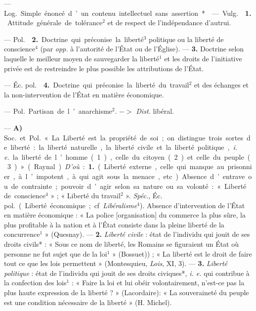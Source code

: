 \begin{itemize}[leftmargin=1cm, label=, itemsep=1pt]
 — \si{Log.} Simple énoncé d’un contenu intellectuel sans
assertion*.

 — \si{Vulg.}  {\bf 1.} Attitude générale de
tolérance$^2$ et de respect de l'indépendance d’autrui.

— \si{Pol.}  {\bf 2.} Doctrine qui préconise la liberté$^3$
politique ou la liberté de conscience$^4$ (par {\it opp.} à l'autorité de
l'État ou de l'Église). — {\bf 3.} Doctrine selon laquelle le meilleur moyen
de sauvegarder la liberté$^1$ et les droits de l'initiative privée est de
restreindre le plus possible les attributions de l’État.

— \si{Éc. pol.}  {\bf 4.} Doctrine qui préconise la liberté du
travail$^2$ et des échanges et la non-intervention de l'État en matière
économique.

 — \si{Pol.} Partisan de l’anarchisme$^2$. $->$ {\it  Dist.}
libéral.

 — {\bf A)} \si{Soc.} et \si{Pol.} « La Liberté
est la propriété de soi ; on distingue
trois sortes de liberté : la liberté naturelle, la liberté civile et la
liberté politique, {\it i. e.} la liberté de l’homme (1), celle du citoyen
(2) et celle du peuple (3) » (Raynal). {\it D'où} : {\bf 1.} (Liberté
externe, celle qui manque au prisonnier, à l’impotent, à qui agit sous la
menace, etc.). Absence d’entrave ou de contrainte; pouvoir d’agir selon sa
nature ou sa volonté : « Liberté de conscience$^4$ » ; « Liberté du
travail$^2$ ». {\it Spéc.}, \si{Éc. pol.} (Liberté économique; cf.
{\it Libéralisme}$^4$). Absence d'intervention de l'État en matière
économique : « La police [organisation] du commerce la plus sûre, la plus
profitable à la nation et à l'État consiste dans la pleine liberté de la
concurrence$^1$ » (Quesnay). — {\bf 2.} {\it Liberté civile} : état de
l'individu qui jouit de ses droits civils* : « Sous ce nom de liberté, les
Romains se figuraient un État où personne ne fut sujet que de la
loi$^1$ » (Bossuet)) ; « La liberté est le droit de faire tout ce que les
lois permettent » (Montesquieu, {\it Lois}, XI, 3). — {\bf 3.} {\it Liberté
politique} : état de l'individu qui jouit de ses droits civiques*, {\it i.
e.} qui contribue à la confection des lois$^1$ : « Faire la loi et lui obéir
volontairement, n'est-ce pas la plus haute expression de la
liberté ? » (Lacordaire): « La souveraineté du peuple est une condition
nécessaire de la liberté » (H. Michel).


\end{itemize}
